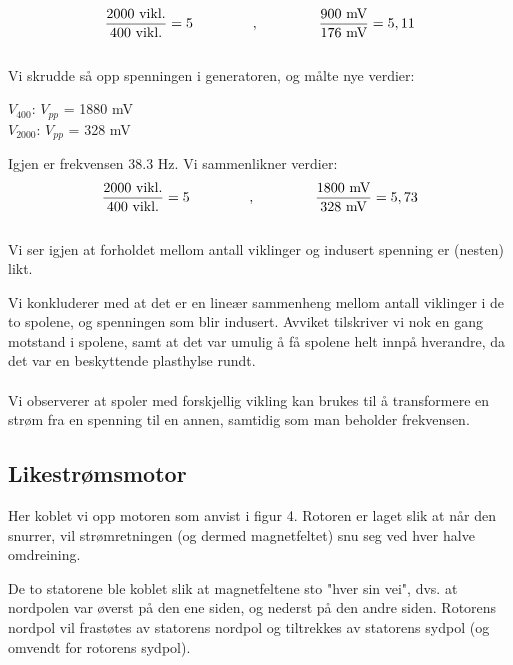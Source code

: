 \documentclass[12pt,norsk,a4paper]{article}
\begin{document}
\begin{equation}
    \label{eq:viklinker1}
    \frac{2000 \textrm{ vikl.} }{400 \textrm{ vikl.} } = 5 \hspace{1.5cm} , \hspace{1.5cm} \frac{900 \textrm{ mV}}{176 \textrm{ mV}} = 5,11
\end{equation}\\
Vi skrudde så opp spenningen i generatoren, og målte nye verdier:\\
\begin{center}
$V_{400}$: $V_{pp}$ = 1880 mV\\

$V_{2000}$: $V_{pp}$ = 328 mV\\
\end{center}
Igjen er frekvensen 38.3 Hz. Vi sammenlikner verdier:\\

\begin{equation}
    \label{eq:viklinger2}
     \frac{2000 \textrm{ vikl.} }{400 \textrm{ vikl.} } = 5 \hspace{1.5cm} , \hspace{1.5cm} \frac{1800 \textrm{ mV}}{328 \textrm{ mV}} = 5,73
\end{equation}\\
Vi ser igjen at forholdet mellom antall viklinger og indusert spenning er (nesten) likt.

Vi konkluderer med at det er en lineær sammenheng mellom antall viklinger i de to spolene, og spenningen som blir indusert. Avviket tilskriver vi nok en gang motstand i spolene, samt at det var umulig å få spolene helt innpå hverandre, da det var en beskyttende plasthylse rundt.\\
\\
Vi observerer at spoler med forskjellig vikling kan brukes til å transformere en strøm fra en spenning til en annen, samtidig som man beholder frekvensen.

\clearpage
\subsection{Likestrømsmotor}
Her koblet vi opp motoren som anvist i figur 4.
Rotoren er laget slik at når den snurrer, vil strømretningen (og dermed magnetfeltet) snu seg ved hver halve omdreining.

De to statorene ble koblet slik at magnetfeltene sto "hver sin vei", dvs. at nordpolen var øverst på den ene siden, og nederst på den andre siden.
Rotorens nordpol vil frastøtes av statorens nordpol og tiltrekkes av statorens sydpol (og omvendt for rotorens sydpol).
\end{document}
